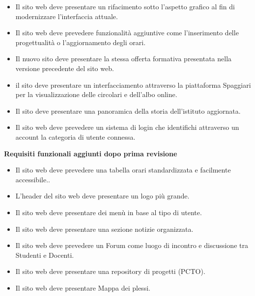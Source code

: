 \documentclass{article}
\begin{document}
\begin{itemize}
	\item Il sito web deve presentare un rifacimento sotto l'aspetto grafico al fin di modernizzare l'interfaccia attuale.
	\item Il sito web deve prevedere funzionalità aggiuntive come l'inserimento delle progettualità o l'aggiornamento degli orari.
	\item Il nuovo sito deve presentare la stessa offerta formativa presentata nella versione precedente del sito web.
	\item il sito deve presentare un interfacciamento attraverso la piattaforma Spaggiari per la visualizzazione delle circolari e dell'albo online.
	\item Il sito deve presentare una panoramica della storia dell'istituto aggiornata.
	\item Il sito web deve prevedere un sistema di login che identifichi attraverso un account la categoria di utente connessa.
	\end{itemize}
	\textbf{Requisiti funzionali aggiunti dopo prima revisione}
\begin{itemize}
	\item Il sito web deve prevedere una tabella orari standardizzata e facilmente accessibile..
	\item L'header del sito web deve presentare un logo più grande.
	\item Il sito web deve presentare dei menù in base al tipo di utente.
	\item Il sito web deve presentare una sezione notizie organizzata.
	\item Il sito web deve prevedere un Forum come luogo di incontro e discussione tra Studenti e Docenti.
	\item Il sito web deve presentare una repository di progetti (PCTO).
	\item Il sito web deve presentare Mappa dei plessi.
\end{itemize}
\end{document}
